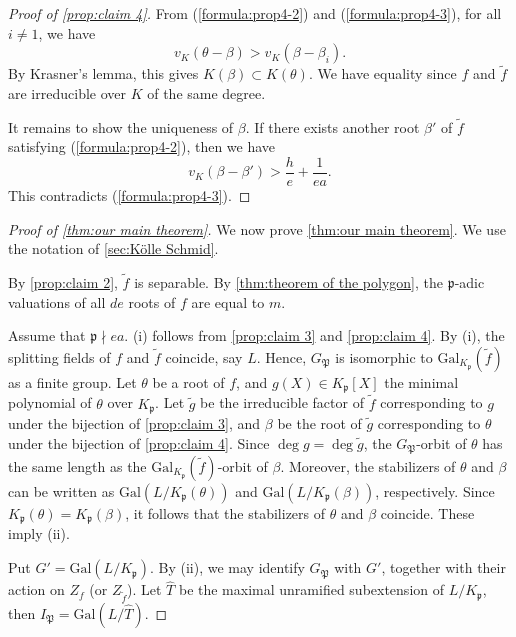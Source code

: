 \documentclass{article}
\newcommand{\Gal}{\mathrm{Gal}}
\theoremstyle{definition}
\theoremstyle{remark}
\numberwithin{equation}{section}
\begin{document}
\begin{proof}[Proof of \cref{prop:claim 4}]
    From (\ref{formula:prop4-2}) and (\ref{formula:prop4-3}), for all $i \ne 1$, 
    we have 
    \[
      v_K(\theta - \beta) > v_K(\beta - \beta_i). 
    \]
    By Krasner's lemma, this gives $K(\beta) \subset K(\theta)$. 
    We have equality since $f$ and $\tilde{f}$ are irreducible over $K$ of the same degree. 

    It remains to show the uniqueness of $\beta$. 
    If there exists another root $\beta'$ of $\tilde{f}$ satisfying (\ref{formula:prop4-2}), then we have 
    \[
      v_K(\beta - \beta') > \frac{h}{e} + \frac{1}{ea}. 
    \]
    This contradicts (\ref{formula:prop4-3}). 
  \end{proof}

  \begin{proof}[Proof of \cref{thm:our main theorem}]
  We now prove \cref{thm:our main theorem}. 
  We use the notation of \cref{sec:Kölle Schmid}. 

  By \cref{prop:claim 2}, $\tilde{f}$ is separable. 
  By \cref{thm:theorem of the polygon}, the $\mathfrak{p}$-adic valuations of all $de$ roots of $f$ are equal to $m$. 

  Assume that $\mathfrak{p} \nmid ea$. 
  (i) follows from \cref{prop:claim 3} and \cref{prop:claim 4}. 
  By (i), the splitting fields of $f$ and $\tilde{f}$ coincide, say $L$.
  Hence, $G_{\mathfrak{P}}$ is isomorphic to $\Gal_{K_{\mathfrak{p}}}(\tilde{f})$ as a finite group. 
  Let $\theta$ be a root of $f$, and $g(X) \in K_{\mathfrak{p}}[X]$ the minimal polynomial of $\theta$ over $K_{\mathfrak{p}}$. 
  Let $\tilde{g}$ be the irreducible factor of $\tilde{f}$ corresponding to $g$ under the bijection of \cref{prop:claim 3}, and 
  $\beta$ be the root of $\tilde{g}$ corresponding to $\theta$ under the bijection of \cref{prop:claim 4}. 
  Since $\deg g = \deg \tilde{g}$, the $G_{\mathfrak{P}}$-orbit of $\theta$ has the same length as the $\Gal_{K_{\mathfrak{p}}}(\tilde{f})$-orbit of $\beta$. 
  Moreover, the stabilizers of $\theta$ and $\beta$ can be written as $\Gal(L/K_{\mathfrak{p}}(\theta))$ and $\Gal(L/K_{\mathfrak{p}}(\beta))$, respectively. 
  Since $K_{\mathfrak{p}}(\theta) = K_{\mathfrak{p}}(\beta)$, it follows that the stabilizers of $\theta$ and $\beta$ coincide. 
  These imply (ii). 

  Put $G' = \Gal(L/K_{\mathfrak{p}})$. By (ii), we may identify $G_{\mathfrak{P}}$ with $G'$, together with their action on $Z_f$ (or $Z_{\tilde{f}}$). 
  Let $\hat{T}$ be the maximal unramified subextension of $L/K_{\mathfrak{p}}$, then $I_{\mathfrak{P}} = \Gal(L/\hat{T})$. 


\end{proof}
\end{document}

